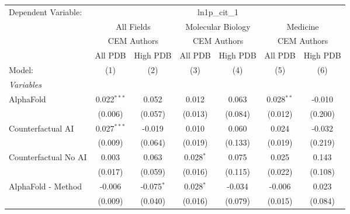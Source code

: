 \begingroup
\centering
\begin{tabular}{lcccccc}
   \tabularnewline \midrule \midrule
   Dependent Variable: & \multicolumn{6}{c}{ln1p\_cit\_1}\\
 & \multicolumn{2}{c}{All Fields} & \multicolumn{2}{c}{Molecular Biology} & \multicolumn{2}{c}{Medicine} \\
\cmidrule(lr){2-3} \cmidrule(lr){4-5} \cmidrule(lr){6-7}
 & \multicolumn{2}{c}{CEM Authors} & \multicolumn{2}{c}{CEM Authors} & \multicolumn{2}{c}{CEM Authors} \\
\cmidrule(lr){2-3} \cmidrule(lr){4-5} \cmidrule(lr){6-7}
 & \multicolumn{1}{c}{All PDB} & \multicolumn{1}{c}{High PDB} & \multicolumn{1}{c}{All PDB} & \multicolumn{1}{c}{High PDB} & \multicolumn{1}{c}{All PDB} & \multicolumn{1}{c}{High PDB} \\
\cmidrule(lr){2-2} \cmidrule(lr){3-3} \cmidrule(lr){4-4} \cmidrule(lr){5-5} \cmidrule(lr){6-6} \cmidrule(lr){7-7}
   Model:                                                     & (1)            & (2)          & (3)           & (4)     & (5)            & (6)\\  
   \midrule
   \emph{Variables}\\
   AlphaFold                                                  & 0.022$^{***}$  & 0.052        & 0.012         & 0.063   & 0.028$^{**}$   & -0.010\\   
                                                              & (0.006)        & (0.057)      & (0.013)       & (0.084) & (0.012)        & (0.200)\\   
   Counterfactual AI                                          & 0.027$^{***}$  & -0.019       & 0.010         & 0.060   & 0.024          & -0.032\\   
                                                              & (0.009)        & (0.064)      & (0.019)       & (0.133) & (0.019)        & (0.219)\\   
   Counterfactual No AI                                       & 0.003          & 0.063        & 0.028$^{*}$   & 0.075   & 0.025          & 0.143\\   
                                                              & (0.017)        & (0.059)      & (0.016)       & (0.115) & (0.022)        & (0.108)\\   
   AlphaFold - Method                                         & -0.006         & -0.075$^{*}$ & 0.028$^{*}$   & -0.034  & -0.006         & 0.023\\   
                                                              & (0.009)        & (0.040)      & (0.016)       & (0.079) & (0.015)        & (0.084)\\   

\end{tabular}
